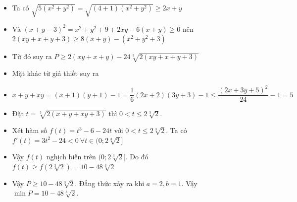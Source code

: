 \lgi 
\begin{itemize}[label=,leftmargin=*]
\item Ta có $\sqrt{5(x^2+y^2)}=\sqrt{(4+1)(x^2+y^2)}\ge 2x+y$
\item Và $(x+y-3)^2=x^2+y^2+9+2xy-6(x+y)\ge 0$ nên $2(xy+x+y+3)\ge 8(x+y)-(x^2+y^2+3)$
\item Từ đó suy ra $P\ge 2(xy+x+y)-24\sqrt[3]{2(xy+x+y+3)}$
\item Mặt khác từ giả thiết suy ra
\item $x+y+xy=(x+1)(y+1)-1=\dfrac{1}{6}(2x+2)(3y+3)-1\le \dfrac{(2x+3y+5)^2}{24}-1=5$
\item Đặt $t=\sqrt[3]{2(x+y+xy+3)}$ thì $0<t\le 2\sqrt[3]{2}$. 
\item Xét hàm số $f(t)=t^3-6-24t$ với $0<t\le 2\sqrt[3]{2}$. Ta có $f'(t)=3t^2-24<0 \ \forall t \in (0;2\sqrt[3]{2}]$
\item Vậy $f(t)$ nghịch biến trên $(0;2\sqrt[3]{2}]$. Do đó $f(t)\ge f(2\sqrt[3]{2})=10-48\sqrt[3]{2}$
\item Vậy $P\ge 10-48\sqrt[3]{2}$. Đẳng thức xảy ra khi $a=2,b=1$. Vậy $\min P=10-48\sqrt[3]{2}$.
\end{itemize}

